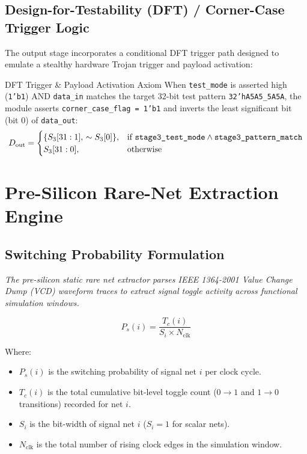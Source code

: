 \documentclass[11pt,a4paper,oneside]{book}
\begin{document}
\section{Design-for-Testability (DFT) / Corner-Case Trigger Logic}

The output stage incorporates a conditional DFT trigger path designed to emulate a stealthy hardware Trojan trigger and payload activation:

\begin{defbox}{DFT Trigger \& Payload Activation Axiom}
When \texttt{test\_mode} is asserted high (\texttt{1'b1}) AND \texttt{data\_in} matches the target 32-bit test pattern \texttt{32'hA5A5\_5A5A}, the module asserts \texttt{corner\_case\_flag = 1'b1} and inverts the least significant bit (bit 0) of \texttt{data\_out}:
\begin{equation}
D_{\text{out}} = \begin{cases}
  \{S_3[31:1],\, \sim S_3[0]\}, & \text{if } \text{\texttt{stage3\_test\_mode}} \land \text{\texttt{stage3\_pattern\_match}} \\
  S_3[31:0], & \text{otherwise}
\end{cases}
\end{equation}
\end{defbox}

\chapter{Pre-Silicon Rare-Net Extraction Engine}

\section{Switching Probability Formulation}

{\itshape
The pre-silicon static rare net extractor parses IEEE 1364-2001 Value Change Dump (VCD) waveform traces to extract signal toggle activity across functional simulation windows.
}

\begin{equation}
P_s(i) = \frac{T_c(i)}{S_i \times N_{\text{clk}}}
\end{equation}

Where:
\begin{itemize}[leftmargin=2em]
  \item $P_s(i)$ is the switching probability of signal net $i$ per clock cycle.
  \item $T_c(i)$ is the total cumulative bit-level toggle count ($0 \rightarrow 1$ and $1 \rightarrow 0$ transitions) recorded for net $i$.
  \item $S_i$ is the bit-width of signal net $i$ ($S_i = 1$ for scalar nets).
  \item $N_{\text{clk}}$ is the total number of rising clock edges in the simulation window.
\end{itemize}
\end{document}
